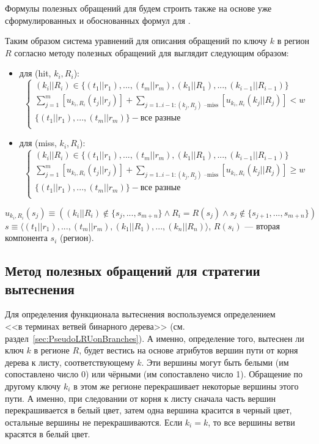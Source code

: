 Формулы полезных обращений для \FIFO будем строить также на основе уже сформулированных и обоснованных формул для \LRU.


Таким образом система уравнений для описания обращений по ключу $k$ в регион $R$
согласно методу полезных обращений для \FIFO выглядит следующим образом:
\begin{itemize}
\item для (hit, $k_i, R_i$):
$$
\left\{\begin{array}{l} (k_i||R_i) \in \{(t_1||r_1), ..., (t_m||r_m), (k_1||R_1), ..., (k_{i-1}||R_{i-1})\}\\
\sum\limits_{j=1}^m [u_{k_i,R_i}(t_j||r_j)] + \sum\limits_{j=1..{i-1}:(k_j,R_j)\mbox{~--miss}} [u_{k_i,R_i}(k_j||R_j)] < w\\
\{(t_1||r_1), ..., (t_m||r_m)\} - \mbox{все разные}\\
\end{array} \right.
$$
\item для (miss, $k_i, R_i$):
$$
\left\{\begin{array}{l} (k_i||R_i) \in \{(t_1||r_1), ..., (t_m||r_m), (k_1||R_1), ..., (k_{i-1}||R_{i-1})\}\\
\sum\limits_{j=1}^m [u_{k_i,R_i}(t_j||r_j)] + \sum\limits_{j=1..{i-1}:(k_j,R_j)\mbox{~--miss}} [u_{k_i,R_i}(k_j||R_j)] \geqslant w\\
\{(t_1||r_1), ..., (t_m||r_m)\} - \mbox{все разные}\\
\end{array} \right.
$$
\end{itemize}

$$u_{k_i,R_i}(s_j) \equiv ((k_i||R_i) \notin \{s_j, ..., s_{m+n}\} \wedge R_i = R(s_j) \wedge s_j \notin\{s_{j+1},..., s_{m+n}\})$$
$s \equiv \langle (t_1||r_1), ..., (t_m||r_m), (k_1||R_1), ..., (k_n||R_n)\rangle$, $R(s_i)$ --- вторая компонента $s_i$ (регион).


\subsection{Метод полезных обращений для стратегии вытеснения \PseudoLRU}

Для определения функционала вытеснения воспользуемся определением\\\PseudoLRU <<в терминах ветвей бинарного дерева>> (см. раздел~\ref{sec:PseudoLRUonBranches}). А именно, определение того, вытеснен ли ключ $k$ в регионе $R$, будет вестись на основе атрибутов вершин пути от корня дерева к  листу, соответствующему $k$. Эти вершины могут быть белыми (им сопоставлено число 0) или чёрными (им сопоставлено число 1). Обращение по другому ключу $k_i$ в этом же регионе перекрашивает некоторые вершины этого пути. А именно, при следовании от корня к листу сначала часть вершин перекрашивается в белый цвет, затем одна вершина красится в черный цвет, остальные вершины не перекрашиваются. Если $k_i = k$, то все вершины ветви красятся в белый цвет.

